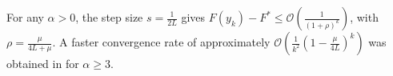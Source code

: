 \documentclass[onefignum,onetabnum]{siamart220329}
\begin{document}
\begin{remark}
For any $\alpha>0$, the step size $s=\frac{1}{2L}$ gives $F(y_k)-F^* \le \mathcal{O}\left( \frac{1}{( 1 + \rho)^k}  \right)$, with $\rho = \frac{\mu}{4L+\mu}$. A faster convergence rate of approximately $\mathcal{O}\left( \frac{1}{k^2}\left( 1 - \frac{\mu}{4L} \right)^k \right)$ was obtained in \cite{Shi_2024,Bao_2023} for $\alpha\ge 3$.   
\end{remark}






\end{document}
